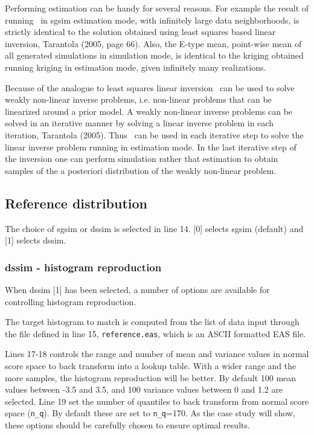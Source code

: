 \documentclass[12t]{article}
\begin{document}
Performing estimation can be handy for several reasons. For example
the result of running
\visimprog~in sgsim estimation mode, with infinitely large data
neighborhoods, is strictly identical to the 
solution obtained using least squares based linear inversion, Tarantola (2005, page 66).
Also, the E-type mean, point-wise mean of all generated simulations in
simulation mode,
is identical to the kriging obtained running kriging in estimation
mode, given infinitely many realizations. 

Because of the analogue to least squares linear inversion
\visimprog~can be used to solve weakly non-linear inverse problems,
i.e. non-linear problems that can be linearized around a prior model.
A weakly non-linear inverse problems can be solved in an iterative
manner by solving a linear inverse problem in each iteration, Tarantola (2005).
Thus \visimprog~can be used in each iterative step to solve the linear
inverse problem running in estimation mode.
In the last iterative step of the inversion one can perform simulation
rather that estimation to obtain samples of the a posteriori
distribution of the weakly non-linear problem.

\subsection{Reference distribution}
The choice of sgsim or dssim is selected in line 14.
[0] selects sgsim (default) and [1] selects dssim.


\subsubsection{dssim - histogram reproduction}
When dssim [1] has been selected, a number of options are available for controlling histogram reproduction.

The target histogram to match is computed from the list of data input through the file defined in line 15, \texttt{reference.eas}, which is an ASCII formatted EAS file.

Lines 17-18 controls the range and number of mean and variance values
in normal score space to back transform into a lookup table. With a
wider range and the more samples, the histogram reproduction will be
better.
By default 100 mean values between -3.5 and 3.5, and 100 variance
values between 0 and 1.2 are selected.
Line 19 set the number of quantiles to back transform from normal
score space (\texttt{n\_q}).
By default these are set to  \texttt{n\_q}=170.
As the case study will show, these options should be carefully chosen to ensure optimal results.
\end{document}
